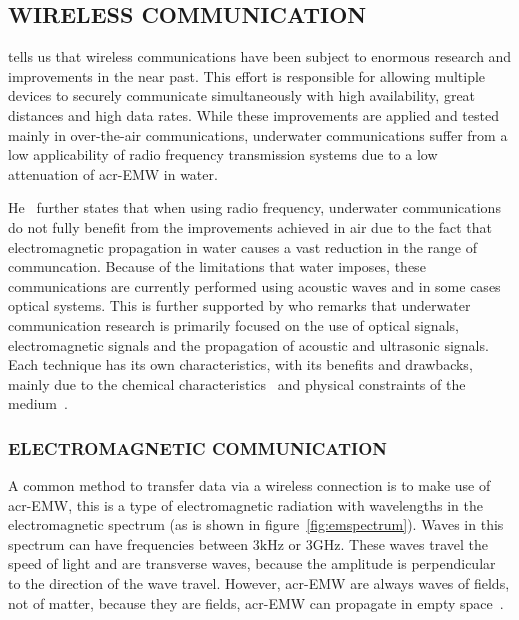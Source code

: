 \subsection{WIRELESS COMMUNICATION}
\citet{freitas_evaluation_2014} tells us that wireless communications have been subject to enormous research and 
improvements in the near past. This effort is responsible for allowing multiple devices to securely communicate 
simultaneously with high availability, great distances and high data rates. While these improvements are applied and 
tested mainly in over-the-air communications, underwater communications suffer from a low applicability of radio 
frequency transmission systems due to a low attenuation of \gls{acr-EMW}  in water.

He~\cite{freitas_evaluation_2014} further states that when using radio frequency, underwater communications do not 
fully benefit from the improvements achieved in air due to the fact that electromagnetic propagation in water causes 
a vast reduction in the range of communcation. Because of the limitations that water imposes, these communications 
are currently performed using acoustic waves and in some cases optical systems. This is further supported by 
\citet{lloret_underwater_2012} who remarks that underwater communication research is primarily focused on the use of 
optical signals, electromagnetic signals and the propagation of acoustic and ultrasonic signals. Each technique has 
its own characteristics, with its benefits and drawbacks, mainly due to the chemical 
characteristics~\cite{garcia_underwater_2011} and physical constraints of the medium~\cite{lanbo_prospects_2008}.

\subsubsection{ELECTROMAGNETIC COMMUNICATION}\label{sec:em}
A common method to transfer data via a wireless connection is to make use of \gls{acr-EMW}, this is a type of 
electromagnetic radiation with wavelengths in the electromagnetic spectrum (as is shown in 
figure~\ref{fig:emspectrum}). Waves in this spectrum can have frequencies between \( 3 \si{\kilo\hertz} \) or \( 3 
\si{\giga\hertz} \). These waves travel the speed of light and are transverse waves, because the amplitude is 
perpendicular to the direction of the wave travel. However, \gls{acr-EMW} are always waves of fields, not of matter, 
because they are fields, \gls{acr-EMW} can propagate in empty space~\cite{giancoli_physics_2015}.

